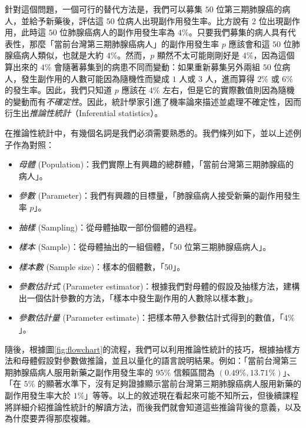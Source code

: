     \smallskip
    
    針對這個問題，一個可行的替代方法是，我們可以募集 $50$ 位第三期肺腺癌的病人，並給予新藥後，評估這 $50$ 位病人出現副作用發生率。比方說有 $2$ 位出現副作用，此時這 $50$ 位肺腺癌病人的副作用發生率為 $4\%$。只要我們募集的病人具有代表性，那麼「當前台灣第三期肺腺癌病人」的副作用發生率 $p$ 應該會和這 $50$ 位肺腺癌病人類似，也就是大約 $4\%$。然而，$p$ 顯然不太可能剛剛好是 $4\%$，因為這個算出來的 $4\%$ 會隨著募集到的病患不同而變動：如果重新募集另外兩組 $50$ 位病人，發生副作用的人數可能因為隨機性而變成 $1$ 人或 $3$ 人，進而算得 $2\%$ 或 $6\%$ 的發生率。因此，我們只知道 $p$ 應該在 $4\%$ 左右，但是它的實際數值則因為隨機的變動而有\textit{不確定性}。因此，統計學家引進了機率論來描述並處理不確定性，因而衍生出\textit{推論性統計}（Inferential statistics）。
    
    在推論性統計中，有幾個名詞是我們必須需要熟悉的。我們條列如下，並以上述例子作為對照：

    \begin{itemize}
        \item \textit{母體} (Population)：我們實際上有興趣的總群體，「當前台灣第三期肺腺癌的病人」。
        \item \textit{參數} (Parameter)：我們有興趣的目標量，「肺腺癌病人接受新藥的副作用發生率 $p$」。
        \item \textit{抽樣} (Sampling)：從母體抽取一部份個體的過程。
        \item \textit{樣本} (Sample)：從母體抽出的一組個體，「$50$ 位第三期肺腺癌病人」。
        \item \textit{樣本數} (Sample size)：樣本的個體數，「$50$」。
        \item \textit{參數估計式} (Parameter estimator)：根據我們對母體的假設及抽樣方法，建構出一個估計參數的方法，「樣本中發生副作用的人數除以樣本數」。
        \item \textit{參數估計量} (Parameter estimate)：把樣本帶入參數估計式得到的數值，「$4\%$」。
    \end{itemize}

    隨後，根據圖\ref{fig:flowchart}的流程，我們可以利用推論性統計的技巧，根據抽樣方法和母體假設對參數做推論，並且以量化的語言說明結果。例如：「當前台灣第三期肺腺癌病人服用新藥之副作用發生率的 $95\%$ 信賴區間為 $(0.49\%, 13.71\%)$」、「在 $5\%$ 的顯著水準下，沒有足夠證據顯示當前台灣第三期肺腺癌病人服用新藥的副作用發生率大於 $1\%$」等等。以上的敘述現在看起來可能不知所云，但後續課程將詳細介紹推論性統計的解讀方法，而後我們就會知道這些推論背後的意義，以及為什麼要弄得那麼複雜。

